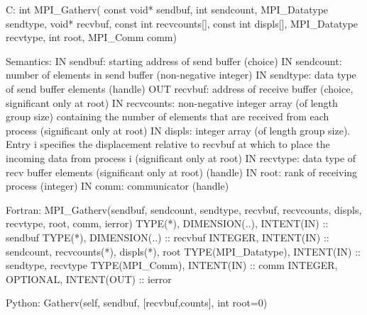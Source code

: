 C:
int MPI_Gatherv(
  const void* sendbuf, int sendcount, MPI_Datatype sendtype,
  void* recvbuf, const int recvcounts[], const int displs[],
  MPI_Datatype recvtype, int root, MPI_Comm comm)

Semantics:
IN sendbuf: starting address of send buffer (choice)
IN sendcount: number of elements in send buffer (non-negative integer)
IN sendtype: data type of send buffer elements (handle)
OUT recvbuf: address of receive buffer (choice, significant only at root)
IN recvcounts: non-negative integer array (of length group size) containing the number of elements that are received from each process (significant only at root)
IN displs: integer array (of length group size). Entry i specifies the displacement relative to recvbuf at which to place the incoming data from process i (significant only at root)
IN recvtype: data type of recv buffer elements (significant only at root) (handle)
IN root: rank of receiving process (integer)
IN comm: communicator (handle)

Fortran:
MPI_Gatherv(sendbuf, sendcount, sendtype, recvbuf, recvcounts, displs, recvtype, root, comm, ierror)
TYPE(*), DIMENSION(..), INTENT(IN) :: sendbuf
TYPE(*), DIMENSION(..) :: recvbuf
INTEGER, INTENT(IN) :: sendcount, recvcounts(*), displs(*), root
TYPE(MPI_Datatype), INTENT(IN) :: sendtype, recvtype
TYPE(MPI_Comm), INTENT(IN) :: comm
INTEGER, OPTIONAL, INTENT(OUT) :: ierror

Python:
Gatherv(self, sendbuf, [recvbuf,counts], int root=0)
